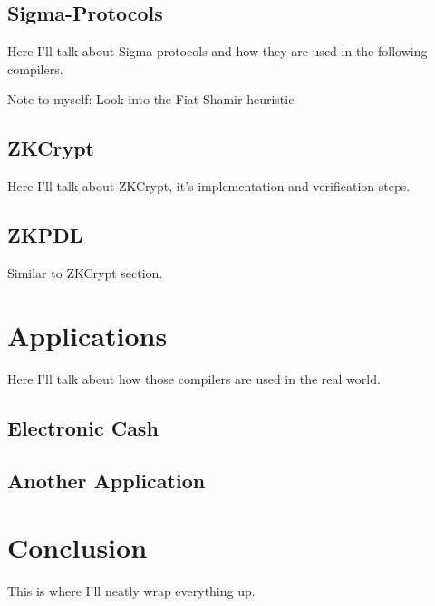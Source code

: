 \documentclass{sig-alternate}
\begin{document}
	\subsection{Sigma-Protocols}
		Here I'll talk about Sigma-protocols and how they are used in the following
		compilers.
		
		Note to myself: Look into the Fiat-Shamir heuristic
	\subsection{ZKCrypt}
		Here I'll talk about ZKCrypt, it's implementation and verification steps.
		
	\subsection{ZKPDL}
		Similar to ZKCrypt section.

\section{Applications}
	Here I'll talk about how those compilers are used in the real world.
	
	\subsection{Electronic Cash}
	
	\subsection{Another Application}

\section{Conclusion}
	This is where I'll neatly wrap everything up.




\end{document}
